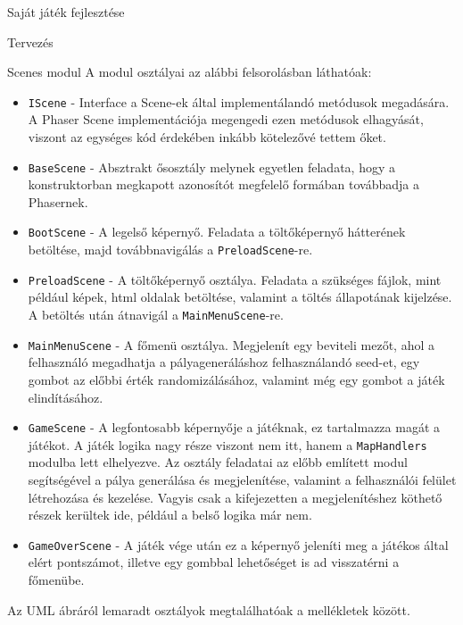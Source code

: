 \begin{MyChapter}{Saját játék fejlesztése}
\begin{MySection}{Tervezés}
\begin{MySubSection}{Scenes modul}
			A modul osztályai az alábbi felsorolásban láthatóak:
			\begin{itemize}
				\item \texttt{IScene} - Interface a Scene-ek által implementálandó metódusok megadására. A Phaser Scene implementációja megengedi ezen metódusok elhagyását, viszont az egységes kód érdekében inkább kötelezővé tettem őket.
				
				\item \texttt{BaseScene} - Absztrakt ősosztály melynek egyetlen feladata, hogy a konstruktorban megkapott azonosítót megfelelő formában továbbadja a Phasernek.
				
				\item \texttt{BootScene} - A legelső képernyő. Feladata a töltőképernyő hátterének betöltése, majd továbbnavigálás a \texttt{PreloadScene}-re.
				
				\item \texttt{PreloadScene} - A töltőképernyő osztálya. Feladata a szükséges fájlok, mint például képek, html oldalak betöltése, valamint a töltés állapotának kijelzése. A betöltés után átnavigál a \texttt{MainMenuScene}-re.
				
				\item \texttt{MainMenuScene} - A főmenü osztálya. Megjelenít egy beviteli mezőt, ahol a felhasználó megadhatja a pályageneráláshoz felhasználandó seed-et, egy gombot az előbbi érték randomizálásához, valamint még egy gombot a játék elindításához.
				
				\item \texttt{GameScene} - A legfontosabb képernyője a játéknak, ez tartalmazza magát a játékot. A játék logika nagy része viszont nem itt, hanem a \texttt{MapHandlers} modulba lett elhelyezve. Az osztály feladatai az előbb említett modul segítségével a pálya generálása és megjelenítése, valamint a felhasználói felület létrehozása és kezelése. Vagyis csak a kifejezetten a megjelenítéshez köthető részek kerültek ide, például a belső logika már nem.
				
				\item \texttt{GameOverScene} - A játék vége után ez a képernyő jeleníti meg a játékos által elért pontszámot, illetve egy gombbal lehetőséget is ad visszatérni a főmenübe.
			\end{itemize}
			
			Az UML ábráról lemaradt osztályok megtalálhatóak a mellékletek között.
		\end{MySubSection}
	

\end{MySection}
\end{MyChapter}
